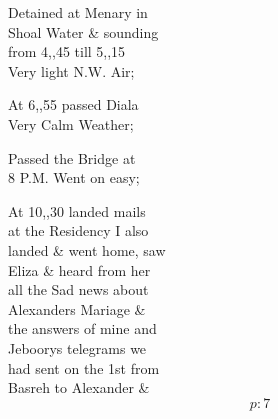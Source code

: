 \documentclass{report}
\begin{document}
	\par{
 	Detained at Menary in\ \\Shoal Water \& sounding\ \\from 4,,45 till 5,,15\ \\Very light N.W. Air;\ \\
	}

	\par{
 	At 6,,55 passed Diala\ \\Very Calm Weather;\ \\
	}

	\par{
 	Passed the Bridge at\ \\8 P.M. Went on easy;\ \\
	}

	\par{
 	At 10,,30 landed mails\ \\at the Residency I also\ \\landed \& went home, saw\ \\Eliza \& heard from her\ \\all the Sad news about\ \\Alexanders Mariage \&\ \\the answers of mine and\ \\Jeboorys telegrams we\ \\had sent on the 1st from\ \\Basreh to Alexander \&\ \\
  \[p: 7 \]

	}


\end{document}
